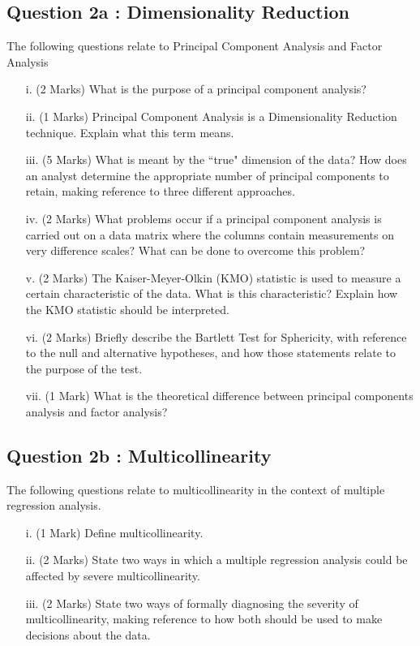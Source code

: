 \documentclass[a4paper,12pt]{article}
\begin{document}
\subsection*{Question 2a : Dimensionality Reduction}
The following questions relate to Principal Component Analysis and Factor Analysis
\begin{itemize}

\item[i.](2 Marks)	What is the purpose of a principal component analysis?
\item[ii.](1 Marks) Principal Component Analysis is a Dimensionality Reduction technique. Explain what this term means.
\item[iii.](5 Marks)	What is meant by the ``true" dimension of the data?  How does an analyst determine the appropriate number of principal components to retain, making reference to three different approaches.
\item[iv.](2 Marks)	What problems occur if a principal component analysis is carried out on a data matrix where the columns contain measurements on very difference scales?  What can be done to overcome this problem?

\item[v.](2 Marks) The Kaiser-Meyer-Olkin (KMO) statistic is used to measure a certain characteristic of the data. What is this characteristic? Explain how the KMO statistic should be interpreted.
\item[vi.](2 Marks) Briefly describe the Bartlett Test for Sphericity, with reference to the null and alternative hypotheses, and how those statements relate to the purpose of the test.
\item[vii.](1 Mark) What is the theoretical difference between principal components analysis and factor analysis?


\end{itemize}



\subsection*{Question 2b : Multicollinearity} %



The following questions relate to multicollinearity in the context of multiple
regression analysis.
\begin{itemize}
\item[i.](1 Mark) Define multicollinearity.
\item[ii.](2 Marks) State two ways in which a multiple regression analysis could be affected by severe
multicollinearity.
\item[iii.](2 Marks) State two ways of formally diagnosing the severity of multicollinearity, making reference to how both should be used to make decisions about the data.

\end{itemize}
\end{document}
